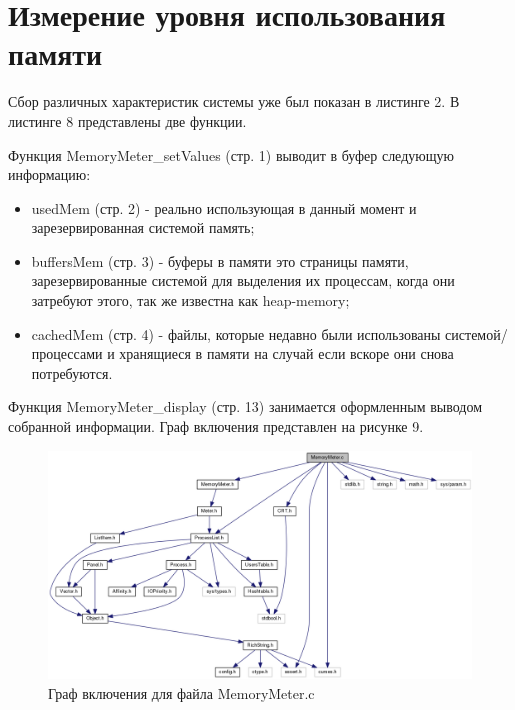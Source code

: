 \documentclass[a4paper, 12pt]{article}		%
\begin{document}
\newpage
\section{Измерение уровня использования памяти}

Сбор различных характеристик системы уже был показан в листинге 2. В листинге 8 представлены две функции.

Функция MemoryMeter\_setValues (стр. 1) выводит в буфер следующую информацию:
\begin{itemize}
\item usedMem (стр. 2) - реально использующая в данный момент и зарезервированная системой память;
\item buffersMem (стр. 3) - буферы в памяти это страницы памяти, зарезервированные системой для выделения их процессам, когда они затребуют этого, так же известна как heap-memory;
\item cachedMem (стр. 4) - файлы, которые недавно были использованы системой/процессами и хранящиеся в памяти на случай если вскоре они снова потребуются.
\end{itemize}

Функция MemoryMeter\_display (стр. 13) занимается оформленным выводом собранной информации. Граф включения представлен на рисунке 9.



\begin{figure}[h!]
\centering
\includegraphics[scale=0.43]{res/memory_meter.png}
\caption{Граф включения для файла MemoryMeter.c}
\end{figure}

\newpage
\end{document}
